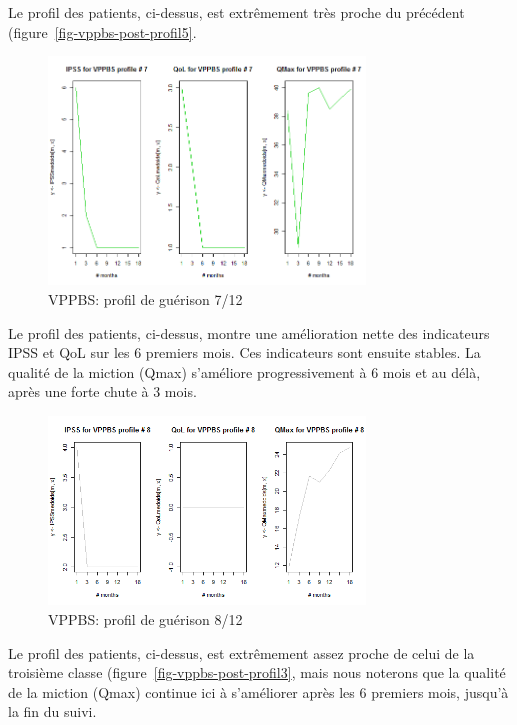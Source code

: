 Le profil des patients, ci-dessus, est extrêmement très proche du précédent (figure~\ref{fig-vppbs-post-profil5}.

\begin{figure}[H]
\centering
\includegraphics[width=0.75\textwidth]{../Fig/VPPBS/vppbs-profil-post-07.png}
\caption[]{VPPBS: profil de guérison 7/12}
\label{fig-vppbs-post-profil7}
\end{figure}

Le profil des patients, ci-dessus, montre une amélioration nette des indicateurs IPSS et QoL sur les 6 premiers mois. Ces indicateurs sont ensuite stables. La qualité de la miction (Qmax) s'améliore progressivement à 6 mois et au délà, après une forte chute à 3 mois.

\begin{figure}[H]
\centering
\includegraphics[width=0.75\textwidth]{../Fig/VPPBS/vppbs-profil-post-08.png}
\caption[]{VPPBS: profil de guérison 8/12}
\label{fig-vppbs-post-profil8}
\end{figure}

Le profil des patients, ci-dessus, est extrêmement assez proche de celui de la troisième classe (figure~\ref{fig-vppbs-post-profil3}, mais nous noterons que la qualité de la miction (Qmax) continue ici à s'améliorer après les 6 premiers mois, jusqu'à la fin du suivi.

